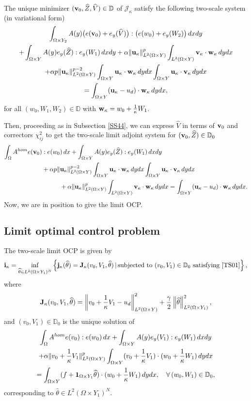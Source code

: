 \documentclass[11pt,a4paper]{article}
\numberwithin{equation}{section}
\def\1{{\bf 1}}
\def\O{\Omega}
\def\a{{\alpha}}
\def\D{{\mathbb{D}}}
\def\Jc{{\mathcal{J}}}
\def\wh{\widehat }
\def\X{\times }
\def\Gi{{\bf i}}
\def\Gj{{\bf j}}
\def\Gu{{\bf u}}
\def\Gv{{\bf v}}
\def\Gw{{\bf w}}
\def\GJ{{\bf J}}
\begin{document}
	The unique minimizer $(\Gv_0,\wh Z,\wh V)\in\D$ of $\Jc_\kappa$ satisfy the following two-scale system (in variational form)
	\begin{multline*}
		\int_{\O\X Y_2} A(y)\big(e(\Gv_0)+e_y(\wh V)\big):\big(e(w_0)+e_y(W_2)\big)\,dx dy\\
		+\int_{\O\X Y}A(y) e_y(\wh Z):e_y(W_1)\,dxdy+\alpha\|\Gu_\kappa\|^p_{L^2(\O\X Y)}\int_{L^2(\O\X Y)}\Gv_\kappa\cdot\Gw_\kappa\,dydx\\
		+\a p\|\Gu_\kappa\|^{p-2}_{L^2(\O\X Y)}\int_{\O\X Y}\Gu_\kappa\cdot\Gw_\kappa\,dydx\int_{\O\X Y}\Gu_\kappa\cdot\Gv_\kappa\,dydx\\
		=\int_{\O\X Y}(\Gu_\kappa-u_d)\cdot\Gw_\kappa\,dydx,
	\end{multline*}
	for all $(w_0,W_1,W_2)\in\D$ with $\Gw_\kappa=w_0+{1\over \kappa}W_1$.
	
	Then, proceeding as in Subsection \ref{SS44}, we can express $\wh V$ in terms of $\Gv_0$ and correctors $\chi^2_{ij}$ to get the two-scale limit adjoint system for $(\Gv_0,\wh Z)\in\D_0$
	\begin{equation}\label{LAS01}
		\begin{aligned}
		\int_{\O} A^{hom}e(\Gv_0)&:e(w_0)\,dx
		+\int_{\O\X Y}A(y) e_y(\wh Z):e_y(W_1)\,dxdy\\
		&+\a p\|\Gu_\kappa\|^{p-2}_{L^2(\O\X Y)}\int_{\O\X Y}\Gu_\kappa\cdot\Gw_\kappa\,dydx\int_{\O\X Y}\Gu_\kappa\cdot\Gv_\kappa\,dydx\\
		&\hskip 10mm +\alpha\|\Gu_\kappa\|^p_{L^2(\O\X Y)}\int_{L^2(\O\X Y)}\Gv_\kappa\cdot\Gw_\kappa\,dydx=\int_{\O\X Y}(\Gu_\kappa-u_d)\cdot\Gw_\kappa\,dydx.
		\end{aligned}
	\end{equation}
	Now, we are in position to give the limit OCP.
	\subsection{Limit optimal control problem}
	 The two-scale limit OCP is given by
	\begin{equation}\label{LOCP}
		\Gi_\kappa=\inf_{\wh \theta\in L^2(\O\X Y_1)^N}\left\{\Gj_\kappa(\wh\theta)=\GJ_\kappa(v_0,V_1,\wh\theta)\,|\,\text{subjected to $(v_0,V_1)\in\D_0$ satisfying \eqref{TS01}}\right\},
	\end{equation}
	where
	$$\GJ_\kappa(v_0,V_1,\wh\theta)= \left\|v_0+{1\over \kappa}V_1-u_d\right\|_{L^2(\O\X Y)}^2+\frac{\gamma}{2}\left\|\wh\theta\right\|^2_{L^2(\O\X Y_1)} ,$$
	and $(v_0,V_1)\in\D_0$ is the unique solution of
	\begin{multline}\label{TS01}
		\int_{\O}A^{hom}e(v_0):e(w_0)\,dx+\int_{\O\X Y}A(y) e_y(V_1):e_y(W_1)\,dxdy\\
		+\a\|v_0+{1\over \kappa}V_1\|^p_{L^2(\O\X Y)}\int_{\O\X Y}(v_0+{1\over \kappa}V_1)\cdot (w_0+{1\over \kappa}W_1)\,dydx\\
		=\int_{\O\X Y}(f+\1_{\O\X Y_1}\wh \theta)\cdot (w_0+{1\over \kappa}W_1)\,dydx,\quad\forall\,(w_0,W_1)\in\D_0,
	\end{multline}
	 corresponding to $\wh\theta\in L^2(\O\X Y_1)^N$.
	 
\end{document}
